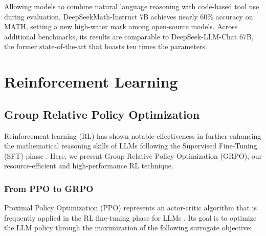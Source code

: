 Allowing models to combine natural language reasoning with code-based tool use during evaluation, DeepSeekMath-Instruct 7B achieves nearly 60\% accuracy on MATH, setting a new high-water mark among open-source models. Across additional benchmarks, its results are comparable to DeepSeek-LLM-Chat 67B, the former state-of-the-art that boasts ten times the parameters.

\section{Reinforcement Learning}

\subsection{Group Relative Policy Optimization} Reinforcement learning (RL) has shown notable effectiveness in further enhancing the mathematical reasoning skills of LLMs following the Supervised Fine-Tuning (SFT) phase \citep{wang2023math,wizardmath}. Here, we present Group Relative Policy Optimization (GRPO), our resource-efficient and high-performance RL technique.

\subsubsection{From PPO to GRPO} Proximal Policy Optimization (PPO) \citep{schulman2017proximal} represents an actor-critic algorithm that is frequently applied in the RL fine-tuning phase for LLMs \citep{ouyang2022training}. Its goal is to optimize the LLM policy through the maximization of the following surrogate objective:

